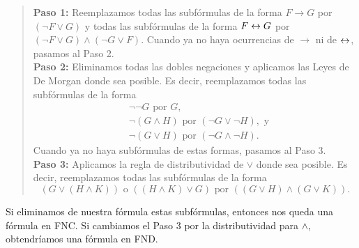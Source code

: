 \documentclass[12pt,a4paper]{book}
\begin{document}
    \begin{quote}
        \textbf{Paso 1:} Reemplazamos todas las subfórmulas de la forma $F\rightarrow G$ por $(\neg F\vee G)$ y todas las
        subfórmulas de la forma $F\leftrightarrow G$ por $(\neg F\vee G)\wedge(\neg G\vee F)$. Cuando ya no haya ocurrencias de
        $\rightarrow$ ni de $\leftrightarrow$, pasamos al Paso 2.\\[0.2cm]
        \textbf{Paso 2:} Eliminamos todas las dobles negaciones y aplicamos las Leyes de De Morgan donde sea posible. Es
        decir, reemplazamos todas las subfórmulas de la forma
        \begin{align*}
            &\neg\neg G\text{ por }G,\\
            &\neg(G\wedge H)\text{ por }(\neg G\vee\neg H),\text{ y}\\
            &\neg(G\vee H)\text{ por }(\neg G\wedge\neg H).
        \end{align*}
        Cuando ya no haya subfórmulas de estas formas, pasamos al Paso 3.\\[0.2cm]
        \textbf{Paso 3:} Aplicamos la regla de distributividad de $\vee$ donde sea posible. Es decir, reemplazamos todas las
        subfórmulas de la forma
        \begin{equation*}
            (G\vee(H\wedge K))\text{ o }((H\wedge K)\vee G)\text{ por }((G\vee H)\wedge(G\vee K)).
        \end{equation*}
    \end{quote}

    Si eliminamos de nuestra fórmula estas subfórmulas, entonces nos queda una fórmula en FNC. Si cambiamos el Paso 3 por la
    distributividad para $\wedge$, obtendríamos una fórmula en FND.
\end{document}

